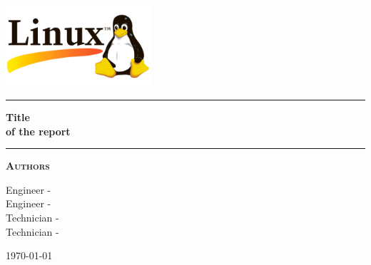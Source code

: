 
\begin{titlepage}
\begin{center}
\vspace{2cm}
\includegraphics[width=0.4\textwidth]{root/Linux-Symbol.png}~\\[1cm]
\vspace{2cm}

\hrule
\vspace{.5cm}
{ \huge \bfseries Title\\ of the report} %
\vspace{.5cm}

\hrule
\vspace{1.5cm}

\textsc{\textbf{Authors}}\\
\vspace{.5cm}
\centering

Engineer - 	\\
Engineer -	\\
Technician - 	\\
Technician - 	\\

\vspace{4cm}

\centering \today 
\end{center}
\end{titlepage}
